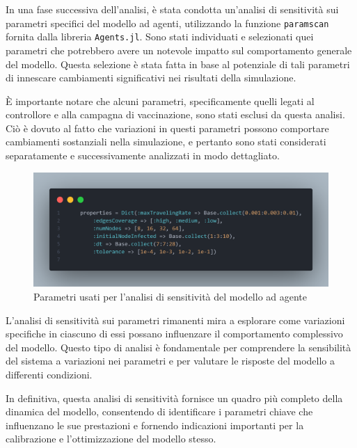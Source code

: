 In una fase successiva dell'analisi, è stata condotta un'analisi di 
sensitività sui parametri specifici del modello ad agenti, 
utilizzando la funzione \texttt{paramscan} fornita dalla libreria 
\texttt{Agents.jl}. Sono stati individuati e selezionati quei 
parametri che potrebbero avere un notevole impatto sul comportamento 
generale del modello. Questa selezione è stata fatta in base al 
potenziale di tali parametri di innescare cambiamenti significativi nei 
risultati della simulazione.

È importante notare che alcuni parametri, specificamente quelli 
legati al controllore e alla campagna di vaccinazione, sono stati 
esclusi da questa analisi. Ciò è dovuto al fatto che variazioni in 
questi parametri possono comportare cambiamenti sostanziali nella 
simulazione, e pertanto sono stati considerati separatamente e 
successivamente analizzati in modo dettagliato.

\begin{figure}[H]
    \begin{center}
		\includegraphics[width=\textwidth]{img/paramscan.png}
		\caption{Parametri usati per l'analisi di sensitività del modello ad agente}
		\label{fig:paramscan}
	\end{center}
\end{figure}

L'analisi di sensitività sui parametri rimanenti mira a esplorare 
come variazioni specifiche in ciascuno di essi possano influenzare 
il comportamento complessivo del modello. Questo tipo di analisi è 
fondamentale per comprendere la sensibilità del sistema a variazioni 
nei parametri e per valutare le risposte del modello a differenti 
condizioni.

In definitiva, questa analisi di sensitività fornisce un quadro più 
completo della dinamica del modello, consentendo di identificare i 
parametri chiave che influenzano le sue prestazioni e fornendo 
indicazioni importanti per la calibrazione e l'ottimizzazione del 
modello stesso.
\newpage

